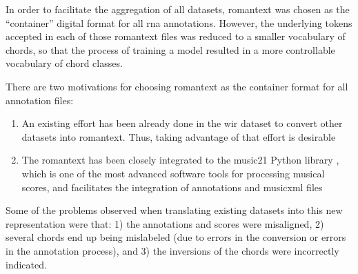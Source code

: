
In order to facilitate the aggregation of all datasets,
\gls{romantext} was chosen as the ``container'' digital
format for all \gls{rna} annotations. However, the
underlying tokens accepted in each of those \gls{romantext}
files was reduced to a smaller vocabulary of chords, so that
the process of training a model resulted in a more
controllable vocabulary of chord classes.

There are two motivations for choosing \gls{romantext} as
the container format for all annotation files:

\begin{enumerate}
    \item An existing effort has been already done in the
    \gls{wir} dataset \parencite{gotham2019romantext,
    gotham2022openscore} to convert other datasets into
    \gls{romantext}. Thus, taking advantage of that effort
    is desirable
    \item The \gls{romantext} has been closely integrated to
    the music21 Python library
    \parencite{cuthbert2010music21}, which is one of the
    most advanced software tools for processing musical
    scores, and facilitates the integration of annotations
    and \gls{musicxml} files
\end{enumerate}

Some of the problems observed when translating existing
datasets into this new representation were that: 1) the
annotations and scores were misaligned, 2) several chords end up being mislabeled (due to errors in the conversion or errors in the annotation process), and 3) the inversions of the chords were incorrectly indicated.